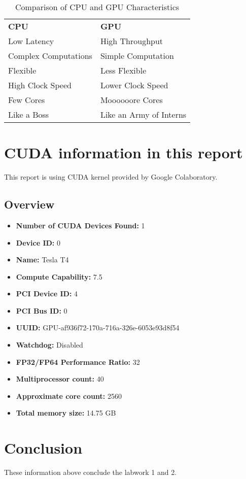 \documentclass{article}
\begin{document}
        \begin{table}[ht]
            \centering
            \begin{tabular}{@{}ll@{}}
                \textbf{CPU}                     & \textbf{GPU}                       \\
                Low Latency                      & High Throughput                    \\
                Complex Computations             & Simple Computation                 \\
                Flexible                         & Less Flexible                      \\
                High Clock Speed                 & Lower Clock Speed                  \\
                Few Cores                        & Moooooore Cores                    \\
                Like a Boss                      & Like an Army of Interns            \\ 
            \end{tabular}
            \caption{Comparison of CPU and GPU Characteristics}
            \label{tab:cpu_gpu_comparison}
        \end{table}
        
\section{CUDA information in this report}
This report is using CUDA kernel provided by Google Colaboratory.

    \subsection{Overview}
    
        \begin{itemize}
            \item \textbf{Number of CUDA Devices Found:} 1
            \item \textbf{Device ID:} 0
            \item \textbf{Name:} Tesla T4
            \item \textbf{Compute Capability:} 7.5
            \item \textbf{PCI Device ID:} 4
            \item \textbf{PCI Bus ID:} 0
            \item \textbf{UUID:} GPU-af936f72-170a-716a-326e-6053e93d8f54
            \item \textbf{Watchdog:} Disabled
            \item \textbf{FP32/FP64 Performance Ratio:} 32
            \item \textbf{Multiprocessor count:} 40
            \item \textbf{Approximate core count:} 2560
            \item \textbf{Total memory size:} 14.75 GB
        \end{itemize}

\section{Conclusion}
    
    These information above conclude the labwork 1 and 2.
\end{document}
